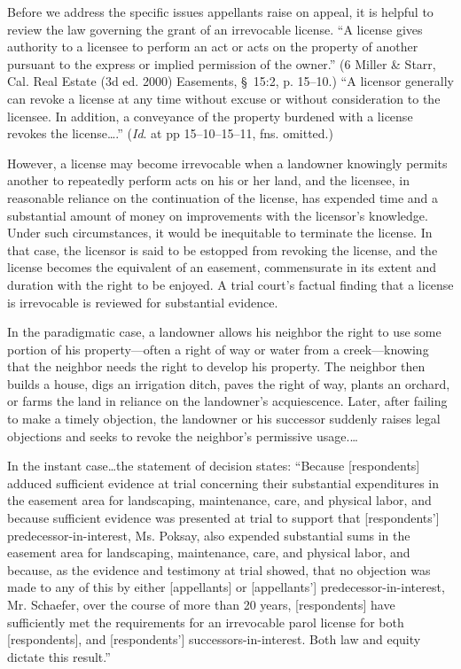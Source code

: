 Before we address the specific issues appellants raise on appeal, it is helpful
to review the law governing the grant of an irrevocable license. ``A license
gives authority to a licensee to perform an act or acts on the property of
another pursuant to the express or implied permission of the owner.'' (6 Miller
\& Starr, Cal. Real Estate (3d ed. 2000) Easements, \S~15:2, p. 15--10.) ``A
licensor generally can revoke a license at any time without excuse or without
consideration to the licensee. In addition, a conveyance of the property
burdened with a license revokes the license\ldots.'' (\textit{Id}. at pp
15--10--15--11, fns. omitted.)

However, a license may become irrevocable when a landowner knowingly permits
another to repeatedly perform acts on his or her land, and the licensee, in
reasonable reliance on the continuation of the license, has expended time and a
substantial amount of money on improvements with the licensor's knowledge. Under
such circumstances, it would be inequitable to terminate the license. In that
case, the licensor is said to be estopped from revoking the license, and the
license becomes the equivalent of an easement, commensurate in its extent and
duration with the right to be enjoyed. A trial court's factual finding that a
license is irrevocable is reviewed for substantial evidence.

In the paradigmatic case, a landowner allows his neighbor the right to use some
portion of his property---often a right of way or water from a creek---knowing
that the neighbor needs the right to develop his property. The neighbor then
builds a house, digs an irrigation ditch, paves the right of way, plants an
orchard, or farms the land in reliance on the landowner's acquiescence. Later,
after failing to make a timely objection, the landowner or his successor
suddenly raises legal objections and seeks to revoke the neighbor's permissive
usage.\dots

In the instant case\ldots the statement of decision states: ``Because
[respondents] adduced sufficient evidence at trial concerning their substantial
expenditures in the easement area for landscaping, maintenance, care, and
physical labor, and because sufficient evidence was presented at trial to
support that [respondents'] predecessor-in-interest, Ms. Poksay, also expended
substantial sums in the easement area for landscaping, maintenance, care, and
physical labor, and because, as the evidence and testimony at trial showed, that
no objection was made to any of this by either [appellants] or [appellants']
predecessor-in-interest, Mr. Schaefer, over the course of more than 20 years,
[respondents] have sufficiently met the requirements for an irrevocable parol
license for both [respondents], and [respondents'] successors-in-interest. Both
law and equity dictate this result.''

